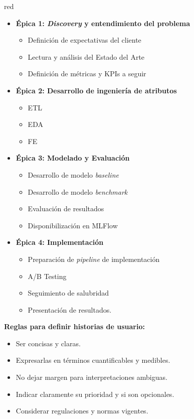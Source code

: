 \documentclass[
11pt, %
]{charter}
\begin{document}
\begin{consigna}{red}
\begin{itemize}
  \item \textbf{\'{E}pica 1: \textit{Discovery} y entendimiento del problema}
    \begin{itemize}
      \item Definición de expectativas del cliente  
      \item Lectura y análisis del Estado del Arte
      \item Definición de métricas y KPIs a seguir
    \end{itemize}
  \item \textbf{\'{E}pica 2: Desarrollo de ingeniería de atributos}
    \begin{itemize}
      \item ETL
      \item EDA
      \item FE 
    \end{itemize}
  \item \textbf{\'{E}pica 3: Modelado y Evaluación}
    \begin{itemize}
      \item Desarrollo de modelo \textit{baseline}
      \item Desarrollo de modelo \textit{benchmark}
      \item Evaluación de resultados
      \item Disponibilización en MLFlow
    \end{itemize}
  \item \textbf{\'{E}pica 4: Implementación}
    \begin{itemize}
      \item Preparación de \textit{pipeline} de implementación
      \item A/B Testing
      \item Seguimiento de salubridad
      \item Presentación de resultados.
    \end{itemize}
\end{itemize}

\textbf{Reglas para definir historias de usuario:}
\begin{itemize}
  \item Ser concisas y claras.
  \item Expresarlas en términos cuantificables y medibles.
  \item No dejar margen para interpretaciones ambiguas.
  \item Indicar claramente su prioridad y si son opcionales.
  \item Considerar regulaciones y normas vigentes.
\end{itemize}

\end{consigna} %
\end{document}
